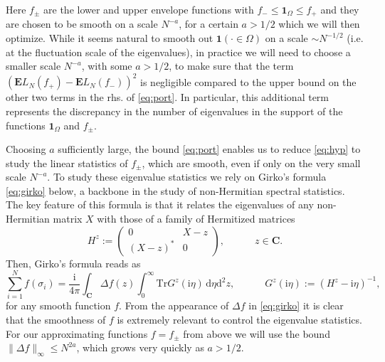\documentclass[10pt]{amsart}
\numberwithin{equation}{section}
\newcommand{\dif}{\mathrm{d}}
\newcommand{\E}{\mathbf{E}}
\newcommand{\C}{\mathbf{C}}
\newcommand{\ii}{\mathrm{i}}
\begin{document}
Here $f_\pm$ are the lower and upper envelope functions with $f_-\le \bm1_\Omega\le f_+$
and they are chosen to be smooth on a scale $N^{-a}$, for a certain $a>1/2$ which we will then optimize.
 While it seems natural to smooth out  $\bm1(\cdot\in\Omega)$ on a scale $\sim N^{-1/2}$ (i.e. at the fluctuation scale of the eigenvalues), in practice we will need to choose a smaller scale $N^{-a}$, with some $a>1/2$, to make sure that the term $(\E L_N(f_+)-\E L_N(f_-))^2$ is negligible compared to the upper bound on the other two terms in the rhs. of \eqref{eq:port}. In particular, this additional term represents the discrepancy in the number of eigenvalues in the support of the functions $\bm1_\Omega$ and $f_\pm$.

Choosing $a$ sufficiently large, %
the bound \eqref{eq:port} enables us to reduce \eqref{eq:hyp} to study the linear statistics of $f_\pm$, which are smooth, even if only on the very small scale $N^{-a}$. To study these eigenvalue statistics we rely on Girko's formula \eqref{eq:girko} below, a backbone in the study of non-Hermitian spectral statistics. The key feature of this formula is that it relates the eigenvalues of any non-Hermitian matrix $X$ with those of a family of Hermitized matrices
\begin{equation}
\label{eq:herm}
H^z:=\left(\begin{matrix}
0 & X-z \\
(X-z)^* & 0
\end{matrix}\right), \qquad\quad z\in\C.
\end{equation}
Then, Girko's formula reads as
\begin{equation}
\label{eq:girko}
\sum_{i=1}^N f(\sigma_i)=\frac{\ii}{4\pi}\int_\C\Delta f(z)\int_0^\infty\mathrm{Tr} G^z(\ii\eta)\, \dif \eta\dif^2 z, \qquad\quad  G^z(\ii\eta):=(H^z-\ii\eta)^{-1},
\end{equation}
for any smooth function $f$. From the appearance of $\Delta f$ in \eqref{eq:girko} it is clear that the smoothness of $f$ is extremely relevant to control the eigenvalue statistics. For our approximating functions $f=f_\pm$ from above we
will use the bound $\lVert \Delta f\rVert_\infty\le N^{2a}$, which grows very quickly as $a>1/2$.
\end{document}
